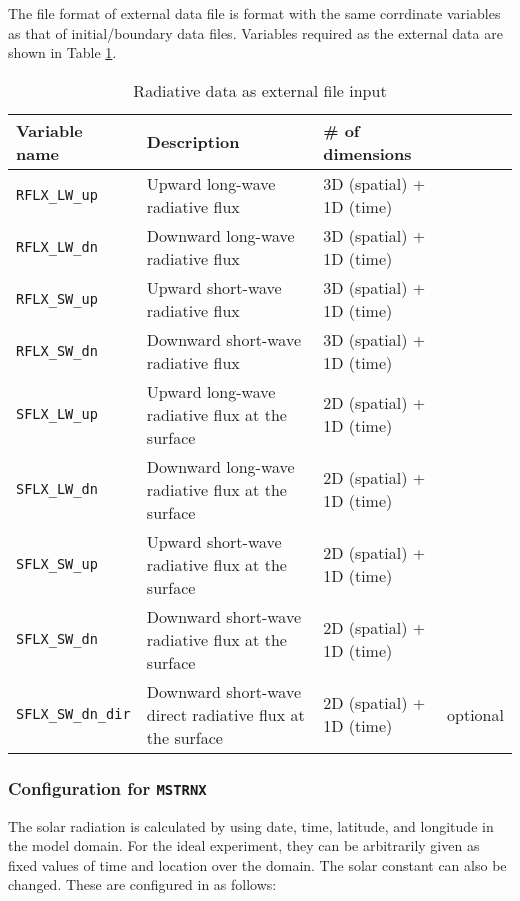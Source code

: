 \noindent
The file format of external data file is \netcdf format
with the same corrdinate variables as that of initial/boundary data files.
Variables required as the external data are shown in Table \ref{tab:var_list_atm_rd_offline}.\\

\begin{table}[h]
\begin{center}
  \caption{Radiative data as external file input}
  \label{tab:var_list_atm_rd_offline}
  \begin{tabularx}{150mm}{lXll} \hline
    \rowcolor[gray]{0.9}  Variable name & Description & \# of dimensions & \\ \hline
      \verb|RFLX_LW_up|     & Upward long-wave radiative flux & 3D (spatial) + 1D (time) \\
      \verb|RFLX_LW_dn|     & Downward long-wave radiative flux & 3D (spatial) + 1D (time) \\
      \verb|RFLX_SW_up|     & Upward short-wave radiative flux & 3D (spatial) + 1D (time) \\
      \verb|RFLX_SW_dn|     & Downward short-wave radiative flux & 3D (spatial) + 1D (time) \\
      \verb|SFLX_LW_up|     & Upward long-wave radiative flux at the surface & 2D (spatial) + 1D (time) \\
      \verb|SFLX_LW_dn|     & Downward long-wave radiative flux at the surface & 2D (spatial) + 1D (time) \\
      \verb|SFLX_SW_up|     & Upward short-wave radiative flux at the surface & 2D (spatial) + 1D (time) \\
      \verb|SFLX_SW_dn|     & Downward short-wave radiative flux at the surface & 2D (spatial) + 1D (time) \\
      \verb|SFLX_SW_dn_dir| & Downward short-wave direct radiative flux at the surface & 2D (spatial) + 1D (time) & optional \\
    \hline
  \end{tabularx}
\end{center}
\end{table}

\subsubsection{Configuration for \texttt{MSTRNX}}

The solar radiation is calculated by using date, time, latitude, and longitude in the model domain.
For the ideal experiment, they can be arbitrarily given as fixed values of time and location over the domain.
The solar constant can also be changed. These are configured in  as follows:

